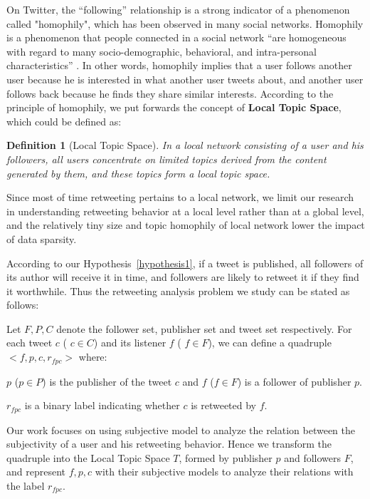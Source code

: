 \documentclass{acm_proc_article-sp}
\newtheorem{definition}{Definition}
\begin{document}
On Twitter, the ``following'' relationship is a strong indicator of a phenomenon called "homophily", which has been observed in many social networks.
Homophily is a phenomenon that people connected in a social network ``are homogeneous with regard to many socio-demographic, behavioral, and intra-personal characteristics'' \cite{mcpherson2001birds}.
In other words, homophily implies that a user follows another user because he is interested in what another user tweets about, and another user follows back because he finds they share similar interests. 
According to the principle of homophily, we put forwards the concept of \textbf{Local Topic Space}, which could be defined as:
\begin{definition}[Local Topic Space]
\label{local}
In a local network consisting of a user and his followers, all users concentrate on limited topics derived from the content generated by them, and these topics form a local topic space.
\end{definition}
Since most of time retweeting pertains to a local network, we limit our research in understanding retweeting behavior at a local level rather than at a global level, and the relatively tiny size and topic homophily of local network lower the impact of data sparsity.

According to our Hypothesis~\ref{hypothesis1}, if a tweet is published, all followers of its author will receive it in time, and followers are likely to retweet it if they find it worthwhile. 
Thus the retweeting analysis problem we study can be stated as follows:

Let $ F, P, C $ denote the follower set, publisher set and tweet set respectively. 
For each tweet $c$ ( $ c \in C $) and its listener $ f $ ( $ f \in F $), we can define a quadruple $ <f, p, c, r_{fpc}>  $ where: 
\begin{itemize*}
\item  $p$ ($p \in P $) is the publisher of the tweet $c$ and $f$ ($ f \in F $) is a follower of publisher $p$.
\item $ r_{fpc} $ is a binary label indicating whether $ c $ is retweeted by $ f $.
\item Our work focuses on using subjective model to analyze the relation between the subjectivity of a user and his retweeting behavior. 
Hence we transform the quadruple into the Local Topic Space $ T $, formed by publisher $ p $ and followers $F $, and represent $ f, p, c $ with their subjective models to analyze their relations with the label $ r_{fpc} $.
\end{itemize*}
\end{document}
